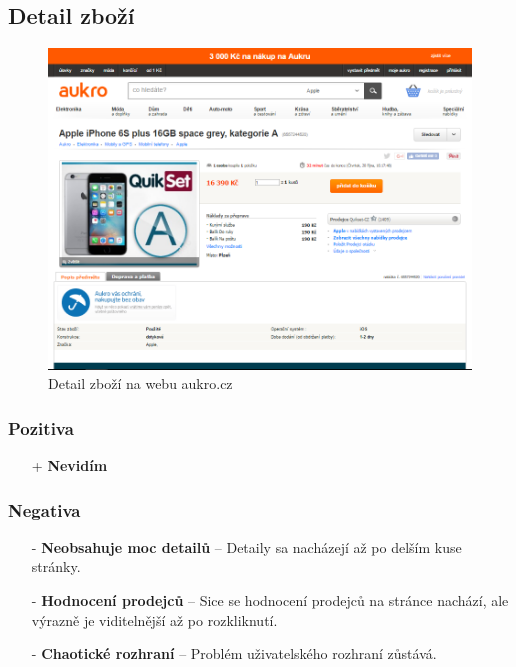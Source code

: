 \newpage
\subsection{Detail zboží}
\begin{figure}[h]
    \centering
    \includegraphics[width=1.0\textwidth]{media/aukro/detail.png}
    \caption{Detail zboží na webu aukro.cz}
    \label{fig:aukro:detail}
\end{figure}
\subsubsection*{Pozitiva}
\begin{itemize}
    \item[+] \textbf{Nevidím}
\end{itemize}
\subsubsection*{Negativa}
\begin{itemize}
    \item[-] \textbf{Neobsahuje moc detailů} -- Detaily sa nacházejí až po delším kuse stránky.
    \item[-] \textbf{Hodnocení prodejců} -- Sice se hodnocení prodejců na stránce nachází, ale výrazně je viditelnější až po rozkliknutí.
    \item[-] \textbf{Chaotické rozhraní} -- Problém uživatelského rozhraní zůstává.
\end{itemize}




